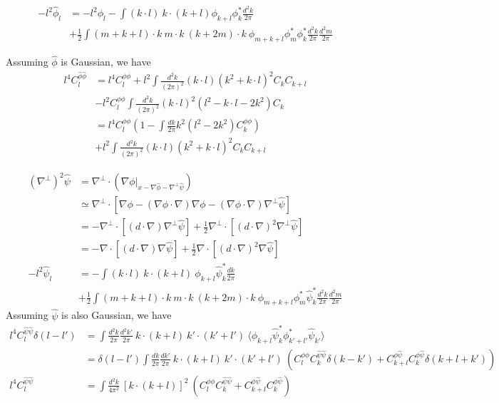 \documentclass[noinfoline]{imsart}
\newcommand{\pinv}{\hat\phi}
\newcommand{\sinv}{\hat\psi}
\begin{document}
\begin{align}
  -l^2\pinv_l
  &= -l^2\phi_l - \int (k\cdot l)\ k\cdot (k + l) \phi_{k+l}\phi_k^*  \frac{d^2k}{2\pi}\nonumber\\
  & +\frac{1}{2}\int (m+k+l)\cdot k\  m\cdot k \ (k+2m)\cdot k\ \phi_{m+k+l}\phi_{m}^*\phi_{k}^*\frac{d^2k}{2\pi}\frac{d^2m}{2\pi}
\end{align}

Assuming $\pinv$ is Gaussian, we have
\begin{align}
  l^4 C_l^{\pinv\pinv}
  &=l^4 C_l^{\phi\phi}  + l^2\int\frac{d^2k}{(2\pi)^2} (k\cdot l)(k^2+k\cdot l)^2 C_k C_{k+l}\nonumber\\
  &-l^2C_l^{\phi\phi}\int \frac{d^2k}{(2\pi)^2} (k\cdot l)^2 (l^2-k\cdot l -2 k^2) C_k \nonumber \\
  &=l^4 C_l^{\phi\phi} \left(1-\int \frac{dk}{2\pi} k^2(l^2-2k^2) C_k^{\phi\phi} \right)\nonumber\\
  &+ l^2\int\frac{d^2k}{(2\pi)^2} (k\cdot l)(k^2+k\cdot l)^2 C_k C_{k+l}\
\end{align}

\begin{align}
(\nabla^{\perp})^2\sinv
  &= \nabla^\perp \cdot \left(\nabla \phi|_{x-\nabla\pinv-\nabla^\perp\sinv}\right)\nonumber\\
  &\simeq \nabla^\perp\cdot  \left[\nabla\phi  - (\nabla\phi  \cdot \nabla)\nabla\phi- (\nabla\phi  \cdot \nabla)\nabla^\perp\sinv\right]\nonumber\\
  &= - \nabla^\perp\cdot \left[(d  \cdot \nabla)\nabla^\perp\sinv \right]
  +\frac{1}{2} \nabla^\perp\cdot \left[(d  \cdot \nabla)^2\nabla^\perp\sinv \right]\nonumber\\
  &= - \nabla \cdot \left[(d  \cdot \nabla)\nabla \sinv \right]
  +\frac{1}{2} \nabla \cdot \left[(d  \cdot \nabla)^2\nabla \sinv \right]\nonumber\\
  -l^2\sinv_l
    &= -\int (k\cdot l) \ k\cdot(k+l)\ \phi_{k+l} \sinv_k^* \frac{dk}{2\pi}\nonumber \\
    & +\frac{1}{2}\int (m+k+l)\cdot k\  m\cdot k \ (k+2m)\cdot k\ \phi_{m+k+l}\phi_{m}^*\sinv_{k}^*\frac{d^2k}{2\pi}\frac{d^2m}{2\pi}
\end{align}
Assuming $\sinv$ is also Gaussian, we have
\begin{align}
  l^4 C_l^{\sinv\sinv} \delta(l-l')
  &= \int \frac{d^2k}{2\pi} \frac{d^2k'}{2\pi}
  \ k\cdot(k+l)\ k'\cdot(k'+l')\ \langle \phi_{k+l} \sinv_k^* \phi_{k'+l'}^* \sinv_{k'} \rangle \nonumber\\
  &=\delta(l-l') \int \frac{dk}{2\pi} \frac{dk'}{2\pi}
  \ k\cdot(k+l)\ k'\cdot(k'+l') \ \left(C_l^{\phi\phi} C_k^{\sinv\sinv}\delta(k-k')
  + C_{k+l}^{\phi\sinv}C_k^{\phi\sinv}\delta(k+l+k')\right)\nonumber\\
  l^4 C_l^{\sinv\sinv}
  &=\int \frac{d^2k}{4\pi^2}
  \ [k\cdot(k+l)]^2\ \left(C_l^{\phi\phi} C_k^{\sinv\sinv}
  + C_{k+l}^{\phi\sinv}C_k^{\phi\sinv}\right)\nonumber\\
\end{align}
\end{document}
